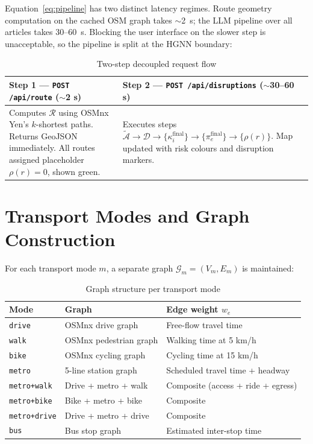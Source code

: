 Equation~\eqref{eq:pipeline} has two distinct latency regimes.
Route geometry computation on the cached OSM graph takes
$\sim$2~s; the LLM pipeline over all articles takes 30--60~s.
Blocking the user interface on the slower step is unacceptable,
so the pipeline is split at the HGNN boundary:

\begin{table}[H]
\centering
\caption{Two-step decoupled request flow}
\begin{tabular}{p{} p{}}
\toprule
\textbf{Step 1 --- \texttt{POST /api/route} ($\sim$2 s)} &
\textbf{Step 2 --- \texttt{POST /api/disruptions} ($\sim$30--60 s)} \\
\midrule
Computes $\mathcal{R}$ using OSMnx Yen's $k$-shortest paths.
Returns GeoJSON immediately.
All routes assigned placeholder $\rho(r) = 0$, shown green. &
Executes steps $\tilde{\mathcal{A}} \to \mathcal{D} \to \{\kappa_i^{\text{final}}\}
\to \{\pi_e^{\text{final}}\} \to \{\rho(r)\}$.
Map updated with risk colours and disruption markers. \\
\bottomrule
\end{tabular}
\end{table}

\section{Transport Modes and Graph Construction}

For each transport mode $m$, a separate graph $\mathcal{G}_m = (V_m, E_m)$
is maintained:

\begin{table}[H]
\centering
\caption{Graph structure per transport mode}
\begin{tabular}{l l l}
\toprule
\textbf{Mode} & \textbf{Graph} & \textbf{Edge weight $w_e$} \\
\midrule
\texttt{drive}        & OSMnx drive graph        & Free-flow travel time \\
\texttt{walk}         & OSMnx pedestrian graph   & Walking time at 5 km/h \\
\texttt{bike}         & OSMnx cycling graph      & Cycling time at 15 km/h \\
\texttt{metro}        & 5-line station graph     & Scheduled travel time + headway \\
\texttt{metro+walk}   & Drive + metro + walk     & Composite (access + ride + egress) \\
\texttt{metro+bike}   & Bike + metro + bike      & Composite \\
\texttt{metro+drive}  & Drive + metro + drive    & Composite \\
\texttt{bus}          & Bus stop graph           & Estimated inter-stop time \\
\bottomrule
\end{tabular}
\end{table}

